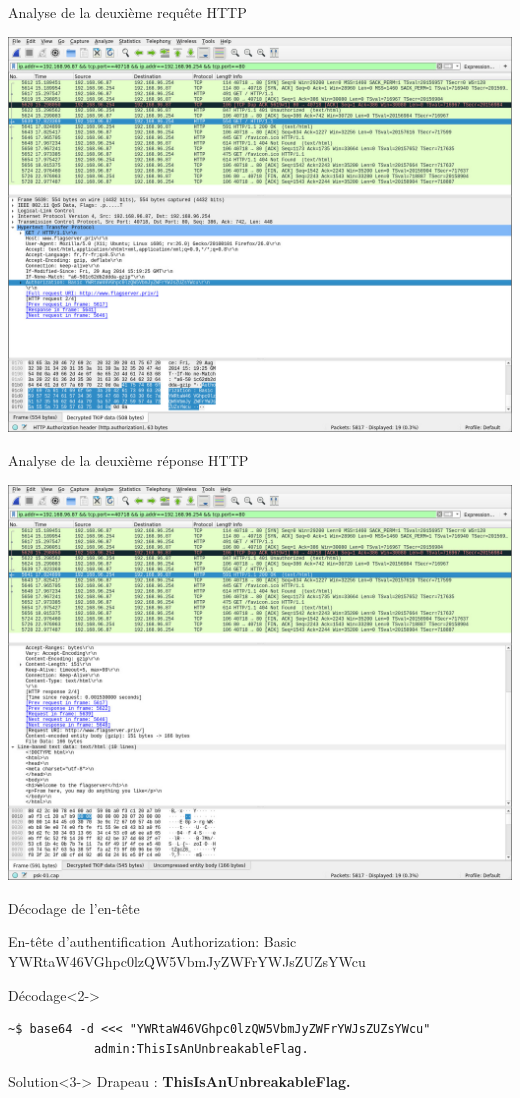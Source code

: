 \documentclass[10pt,sans,usenames,dvipsnames,french,compress]{beamer}
\begin{document}
\begin{frame}{Analyse de la deuxième requête HTTP}
	\begin{center}
		\includegraphics[width=0.8\linewidth]{118/wireshark6}
	\end{center}
\end{frame}

\begin{frame}{Analyse de la deuxième réponse HTTP}
	\begin{center}
		\includegraphics[width=0.8\linewidth]{118/wireshark7}
	\end{center}
\end{frame}

\begin{frame}[fragile]{Décodage de l'en-tête}
	\begin{block}{En-tête d'authentification}
		Authorization: Basic YWRtaW46VGhpc0lzQW5VbmJyZWFrYWJsZUZsYWcu
	\end{block}

	\begin{block}{Décodage}<2->
		\vspace{-3mm}
		\begin{lstlisting}[style=Term]
			~$ base64 -d <<< "YWRtaW46VGhpc0lzQW5VbmJyZWFrYWJsZUZsYWcu"
			admin:ThisIsAnUnbreakableFlag.
		\end{lstlisting}
		\vspace{-2mm}
	\end{block}

	\begin{exampleblock}{Solution}<3->
		Drapeau : \textbf{ThisIsAnUnbreakableFlag.}
	\end{exampleblock}
\end{frame}
\end{document}
